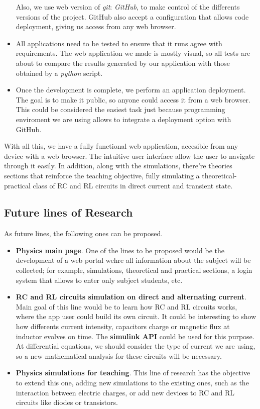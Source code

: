 \documentclass[../main.tex]{subfiles}
\begin{document}
\begin{itemize}
    Also, we use web version of \textit{git}: \textit{GitHub}, to make control of the differents versions of the project. GitHub also accept a configuration that allows code deployment, giving us access from any web browser.
    
    \item All applications need to be tested to ensure that it runs agree with requirements. The web application we made is mostly visual, so all tests are about to compare the results generated by our application with those obtained by a \textit{python} script.
   
    \item Once the development is complete, we perform an application deployment. The goal is to make it public, so anyone could access it from a web browser. This could be considered the easiest task just because programming enviroment we are using allows to integrate a deployment option with GitHub.
    


\end{itemize}

With all this, we have a fully functional web application, accesible from any device with a web browser. The intuitive user interface allow the user to navigate through it easily. In addition, along with the simulations, there're theories sections that reinforce the teaching objective, fully simulating a theoretical-practical class of RC and RL circuits in direct current and transient state.


\subsection{Future lines of Research}
As future lines, the following ones can be proposed.

\begin{itemize}
    \item \textbf{Physics main page}. One of the lines to be proposed would be the development of a web portal wehre all information about the subject will be collected; for example, simulations, theoretical and practical sections, a login system that allows to enter only subject students, etc.
    
    \item \textbf{RC and RL circuits simulation on direct and alternating current}. Main goal of this line would be to learn how RC and RL circuits works, where the app user could build its own circuit. It could be interesting to show how differents current intensity, capacitors charge or magnetic flux at inductor evolves on time. The \textbf{simulink API} could be used for this purpose. At differential equations, we should consider the type of current we are using, so a new mathematical analysis for these circuits will be necessary. 
    
    \item \textbf{Physics simulations for teaching}. This line of research has the objective to extend this one, adding new simulations to the existing ones, such as the interaction between electric charges, or add new devices to RC and RL circuits like diodes or transistors.
\end{itemize}
\end{document}
